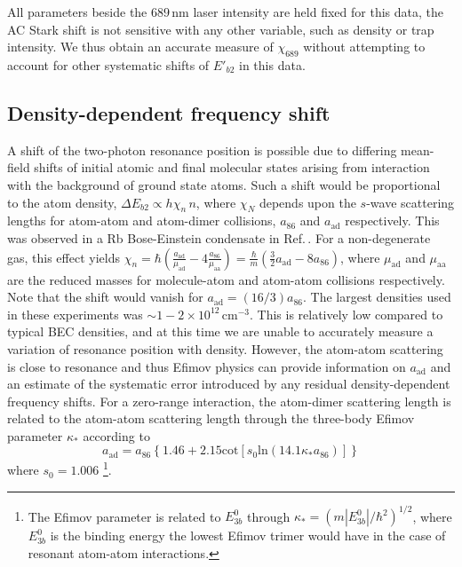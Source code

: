 All parameters beside the $689$\,nm laser intensity are held fixed for this data, the AC Stark shift is not sensitive  with any other variable, such as density or trap intensity.
We thus obtain an accurate measure of $\chi_{689}$ without attempting to account for other systematic shifts of $E'_{b2}$ in this data.

\subsection{Density-dependent frequency shift}
A shift of the two-photon resonance position is possible due to differing mean-field shifts of initial atomic and final molecular states arising from interaction with the background of ground state atoms.
Such a shift would be proportional to the atom density, $\Delta E_{b2} \propto h \chi_n\,n$, where $\chi_N$ depends upon the $s$-wave scattering lengths for atom-atom and atom-dimer collisions, $a_{86}$ and $a_{\text{ad}}$ respectively.
This was observed in a Rb Bose-Einstein condensate in Ref.\,\cite{Wynar2000}. 
For a non-degenerate gas, this effect yields $\chi_n=\hbar (\frac{a_{\text{ad}}}{\mu_{\text{ad}}}-4\frac{a_{86}}{\mu_{\text{aa}}})=\frac{\hbar}{m} (\frac{3 }{2}a_{\text{ad}}-8 a_{86})$, where $\mu_{\text{ad}}$ and $\mu_{\text{aa}}$ are the reduced masses for molecule-atom and atom-atom collisions respectively.
Note that the shift would vanish for $a_{\text{ad}}=(16/3) a_{86}$.
The largest densities used in these experiments was $\sim 1-2\times 10^{12}\,\mathrm{cm}^{-3}$.
This is relatively low compared to typical BEC densities, and at this time we are unable to accurately measure a variation of resonance position with density.
However, the atom-atom scattering is close to resonance and thus Efimov physics can provide information on $a_{\text{ad}}$ \cite{bha07,nen17} and an estimate of the systematic error introduced by any residual density-dependent frequency shifts.
For a zero-range interaction, the atom-dimer scattering length is related to the atom-atom scattering length through the three-body Efimov parameter $\kappa_*$ according to \cite{bha07}
\begin{equation}\label{Eq:EfimovMoleculAtomScatteringLength}
  a_{\text{ad}}=a_{86}\left\{1.46 + 2.15 \mathrm{cot}[s_0 \mathrm{ln} (14.1\kappa_* a_{86}) ]\right\}
\end{equation}
where $s_0=1.006$ \footnote{The Efimov parameter is related to $E^0_{3b}$ through $\kappa_*=(m|E^0_{3b}|/\hbar^2)^{1/2}$, where $E^0_{3b}$ is the binding energy the lowest Efimov trimer would have in the case of resonant atom-atom interactions.}.


